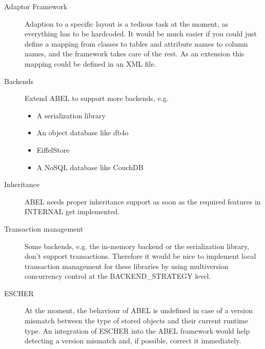 \begin{description}
 \item [Adaptor Framework] Adaption to a specific layout is a tedious task at the moment, as everything has to be hardcoded. 
It would be much easier if you could just define a mapping from classes to tables and attribute names to column names, and the framework takes care of the rest.
As an extension this mapping could be defined in an XML file.
\item [Backends] Extend ABEL to support more backends, e.g.
\begin{itemize}
 \item A serialization library
 \item An object database like db4o
 \item EiffelStore
 \item A NoSQL database like CouchDB
\end{itemize}
 \item [Inheritance] ABEL needs proper inheritance support as soon as the required features in INTERNAL get implemented.
\item [Transaction management] Some backends, e.g. the in-memory backend or the serialization library, don't support transactions.
 Therefore it would be nice to implement local transaction management for these libraries by using multiversion concurrency control at the BACKEND\_STRATEGY level.
\item [ESCHER] At the moment, the behaviour of ABEL is undefined in case of a version mismatch between the type of stored objects and their current runtime type. 
An integration of ESCHER into the ABEL framework would help detecting a version mismatch and, if possible, correct it immediately.
\end{description}
